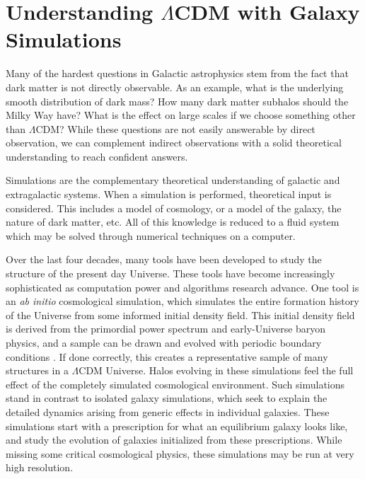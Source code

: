 
\section{Understanding $\Lambda$CDM with Galaxy Simulations}

Many of the hardest questions in Galactic astrophysics stem from the fact that dark matter is not directly observable. As an example, what is the underlying smooth distribution of dark mass? How many dark matter subhalos should the Milky Way have? What is the effect on large scales if we choose something other than $\Lambda$CDM? While these questions are not easily answerable by direct observation, we can complement indirect observations with a solid theoretical understanding to reach confident answers.

Simulations are the complementary theoretical understanding of galactic and extragalactic systems. When a simulation is performed, theoretical input is considered. This includes a model of cosmology, or a model of the galaxy, the nature of dark matter, etc. All of this knowledge is reduced to a fluid system which may be solved through numerical techniques on a computer.  

Over the last four decades, many tools have been developed to study the structure of the present day Universe. These tools have become increasingly sophisticated as computation power and algorithms research advance. One tool is an \textit{ab initio} cosmological simulation, which simulates the entire formation history of the Universe from some informed initial density field.  This initial density field is derived from the primordial power spectrum and early-Universe baryon physics, and a sample can be drawn and evolved with periodic boundary conditions \citep{music}. If done correctly, this creates a representative sample of many structures in a $\Lambda$CDM Universe. Halos evolving in these simulations feel the full effect of the completely simulated cosmological environment. Such simulations stand in contrast to isolated galaxy simulations, which seek to explain the detailed dynamics arising from generic effects in individual galaxies. These simulations start with a prescription for what an equilibrium galaxy looks like, and study the evolution of galaxies initialized from these prescriptions. While missing some critical cosmological physics, these simulations may be run at very high resolution.



